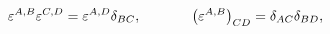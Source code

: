 \begin{equation}
\varepsilon ^{A,B}\varepsilon ^{C,D}=\varepsilon ^{A,D}\delta
_{BC} ,\hspace{0.5in}\left( \varepsilon ^{A,B}\right) _{CD}=\delta
_{AC}\delta _{BD} ,\label{16}
\end{equation}


